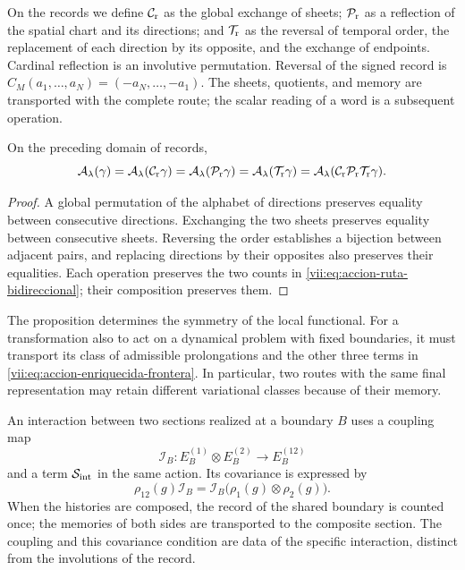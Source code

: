 On the records we define \(\mathcal C_{\rm r}\) as the global exchange of
sheets; \(\mathcal P_{\rm r}\) as a reflection of the spatial chart and its
directions; and \(\mathcal T_{\rm r}\) as the reversal of temporal order,
the replacement of each direction by its opposite, and the exchange of
endpoints. Cardinal reflection is an involutive permutation.
Reversal of the signed record is
\(C_M(a_1,\ldots,a_N)=(-a_N,\ldots,-a_1)\).
The sheets, quotients, and memory are transported with the complete route;
the scalar reading of a word is a subsequent operation.

\begin{proposition}
\label{vii:prop:invariancia-ruta-bidireccional}
On the preceding domain of records,
\[
 \mathcal A_\lambda(\gamma)
 =\mathcal A_\lambda(\mathcal C_{\rm r}\gamma)
 =\mathcal A_\lambda(\mathcal P_{\rm r}\gamma)
 =\mathcal A_\lambda(\mathcal T_{\rm r}\gamma)
 =\mathcal A_\lambda(\mathcal C_{\rm r}\mathcal P_{\rm r}
                              \mathcal T_{\rm r}\gamma).
\]
\end{proposition}
\begin{proof}
A global permutation of the alphabet of directions preserves equality
between consecutive directions. Exchanging the two sheets preserves equality
between consecutive sheets. Reversing the order establishes a bijection between
adjacent pairs, and replacing directions by their opposites also preserves their
equalities. Each operation preserves the two counts in
\eqref{vii:eq:accion-ruta-bidireccional}; their composition preserves them.
\end{proof}

The proposition determines the symmetry of the local functional. For a
transformation also to act on a dynamical problem with fixed boundaries,
it must transport its class of admissible prolongations and the other three
terms in \eqref{vii:eq:accion-enriquecida-frontera}. In particular, two
routes with the same final representation may retain different variational
classes because of their memory.

An interaction between two sections realized at a boundary \(B\)
uses a coupling map
\[
 \mathcal I_B:E_B^{(1)}\otimes E_B^{(2)}\longrightarrow E_B^{(12)}
\]
and a term \(\mathcal S_{\rm int}\) in the same action. Its covariance
is expressed by
\[
 \rho_{12}(g)\mathcal I_B
 =\mathcal I_B\bigl(\rho_1(g)\otimes\rho_2(g)\bigr).
\]
When the histories are composed, the record of the shared boundary is counted
once; the memories of both sides are transported to the composite section.
The coupling and this covariance condition are data of the specific interaction,
distinct from the involutions of the record.

